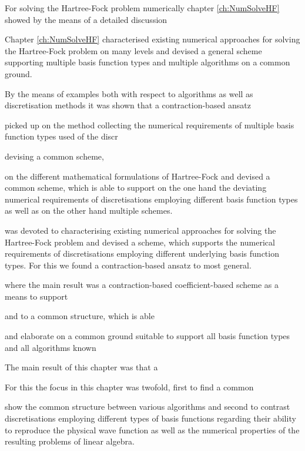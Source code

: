 For solving the Hartree-Fock problem numerically chapter \ref{ch:NumSolveHF}
showed by the means of a detailed discussion 

Chapter \ref{ch:NumSolveHF} characterised existing numerical approaches
for solving the Hartree-Fock problem on many levels
and devised a general scheme supporting multiple basis
function types and multiple \SCF algorithms on a common ground.

By the means of examples both with respect to \SCF algorithms
as well as discretisation methods
it was shown that a contraction-based \SCF ansatz 



picked up on the \SCF method
collecting the numerical requirements of multiple
basis function types used of the discr

devising a common scheme,


on the different mathematical
formulations of Hartree-Fock and devised a common scheme,
which is able to support on the one hand the deviating
numerical requirements of discretisations employing different
basis function types
as well as on the other hand multiple \SCF schemes.



was devoted to characterising
existing numerical approaches for solving the Hartree-Fock problem
and devised a scheme,
which supports the numerical requirements of discretisations employing different
underlying basis function types.
For this we found a contraction-based ansatz to most general.



where the main result was a contraction-based coefficient-based \SCF
scheme as a means to support


and to  a common structure,
which is able 


and elaborate on a common ground suitable to support
all basis function types and all \SCF algorithms known

The main result of this chapter was
that a 


For this the focus in this chapter was twofold,
first to find a common 

show the common structure between various \SCF
algorithms and second to contrast discretisations
employing different types of basis functions
regarding their ability to reproduce the physical wave function
as well as the numerical properties of the resulting problems of linear algebra.



